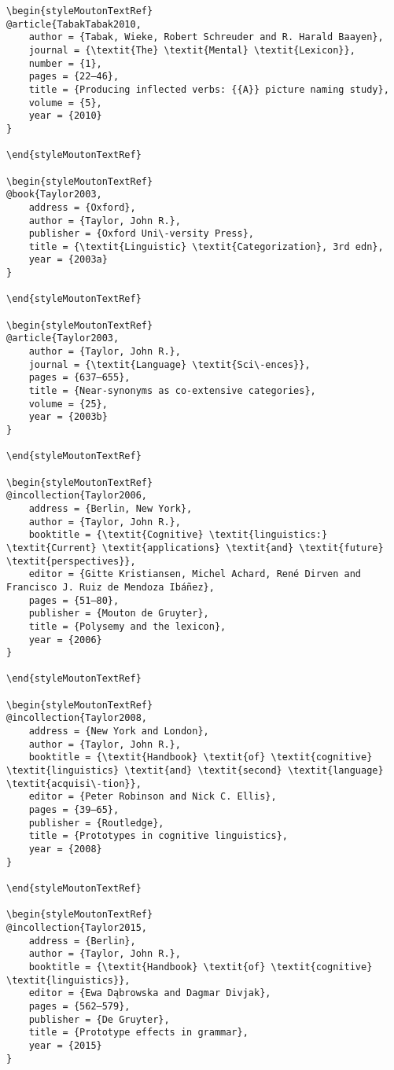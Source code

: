 \begin{styleMoutonHeadingi}
\begin{verbatim}
\begin{styleMoutonTextRef}
@article{TabakTabak2010,
	author = {Tabak, Wieke, Robert Schreuder and R. Harald Baayen},
	journal = {\textit{The} \textit{Mental} \textit{Lexicon}},
	number = {1},
	pages = {22–46},
	title = {Producing inflected verbs: {{A}} picture naming study},
	volume = {5},
	year = {2010}
}

\end{styleMoutonTextRef}

\begin{styleMoutonTextRef}
@book{Taylor2003,
	address = {Oxford},
	author = {Taylor, John R.},
	publisher = {Oxford Uni\-versity Press},
	title = {\textit{Linguistic} \textit{Categorization}, 3rd edn},
	year = {2003a}
}

\end{styleMoutonTextRef}

\begin{styleMoutonTextRef}
@article{Taylor2003,
	author = {Taylor, John R.},
	journal = {\textit{Language} \textit{Sci\-ences}},
	pages = {637–655},
	title = {Near-synonyms as co-extensive categories},
	volume = {25},
	year = {2003b}
}

\end{styleMoutonTextRef}

\begin{styleMoutonTextRef}
@incollection{Taylor2006,
	address = {Berlin, New York},
	author = {Taylor, John R.},
	booktitle = {\textit{Cognitive} \textit{linguistics:} \textit{Current} \textit{applications} \textit{and} \textit{future} \textit{perspectives}},
	editor = {Gitte Kristiansen, Michel Achard, René Dirven and Francisco J. Ruiz de Mendoza Ibáñez},
	pages = {51–80},
	publisher = {Mouton de Gruyter},
	title = {Polysemy and the lexicon},
	year = {2006}
}

\end{styleMoutonTextRef}

\begin{styleMoutonTextRef}
@incollection{Taylor2008,
	address = {New York and London},
	author = {Taylor, John R.},
	booktitle = {\textit{Handbook} \textit{of} \textit{cognitive} \textit{linguistics} \textit{and} \textit{second} \textit{language} \textit{acquisi\-tion}},
	editor = {Peter Robinson and Nick C. Ellis},
	pages = {39–65},
	publisher = {Routledge},
	title = {Prototypes in cognitive linguistics},
	year = {2008}
}

\end{styleMoutonTextRef}

\begin{styleMoutonTextRef}
@incollection{Taylor2015,
	address = {Berlin},
	author = {Taylor, John R.},
	booktitle = {\textit{Handbook} \textit{of} \textit{cognitive} \textit{linguistics}},
	editor = {Ewa Dąbrowska and Dagmar Divjak},
	pages = {562–579},
	publisher = {De Gruyter},
	title = {Prototype effects in grammar},
	year = {2015}
}


\end{verbatim}
\end{styleMoutonHeadingi}
